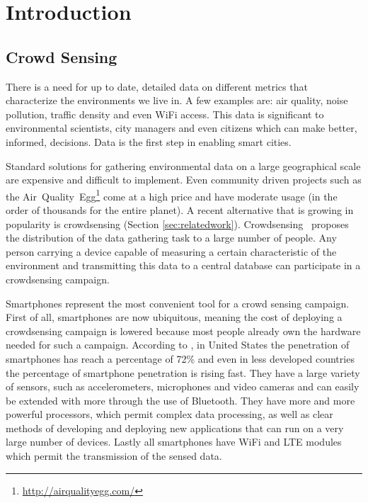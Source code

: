 \chapter{Introduction}
\label{chapter:intro}

\section{Crowd Sensing}
\label{sec:intro-crowd}
There is a need for up to date, detailed data on different metrics that characterize the environments we live in. A few examples are: air quality, noise pollution, traffic density and even WiFi access. This data is significant to environmental scientists, city managers and even citizens which can make better, informed, decisions. Data is the first step in enabling smart cities.

Standard solutions for gathering environmental data on a large geographical scale are expensive and difficult to implement. Even community driven projects such as the Air~Quality~Egg\footnote{\url{http://airqualityegg.com/}} come at a high price and have moderate usage (in the order of thousands for the entire planet). A recent alternative that is growing in popularity is crowdsensing (Section \ref{sec:relatedwork}). Crowdsensing~\cite{riva2007urbanet} proposes the distribution of the data gathering task to a large number of people. Any person carrying a device capable of measuring a certain characteristic of the environment and transmitting this data to a central database can participate in a crowdsensing campaign.

Smartphones represent the most convenient tool for a crowd sensing campaign. First of all, smartphones are now ubiquitous, meaning the cost of deploying a crowdsensing campaign is lowered because most people already own the hardware needed for such a campaign. According to \cite{poushter2016smartphone}, in United States the penetration of smartphones has reach a percentage of 72\% and even in less developed countries the percentage of smartphone penetration is rising fast. They have a large variety of sensors, such as accelerometers, microphones and video cameras and can easily be extended with more through the use of Bluetooth. They have more and more powerful processors, which permit complex data processing, as well as clear methods of developing and deploying new applications that can run on a very large number of devices. Lastly all smartphones have WiFi and LTE modules which permit the transmission of the sensed data.

